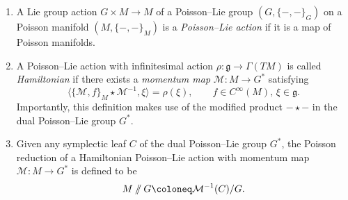 \begin{definition}
	\begin{enumerate}[label=(\roman*)]
		\item A Lie group action $G \times M \to M$ of a Poisson--Lie group $(G,\{-,-\}_G)$ on a Poisson manifold $(M,\{-,-\}_M)$ is a \emph{Poisson--Lie action} if it is a map of Poisson manifolds.
		\item A Poisson--Lie action with infinitesimal action $\rho \colon \mathfrak{g} \to \Gamma(TM)$ is called \emph{Hamiltonian} if there exists a \emph{momentum map} $\mathcal{M} \colon M \to G^*$ satisfying
		\begin{equation}\label{eq:momentumMap}
			\langle \{\mathcal{M},f\}_M \star \mathcal{M}^{-1}, \xi \rangle = \rho(\xi), \qquad f \in C^\infty(M), \, \xi \in \mathfrak{g}.
		\end{equation}
		Importantly, this definition makes use of the modified product $-\star-$ in the dual Poisson--Lie group $G^*$.
		\item Given any symplectic leaf $C$ of the dual Poisson--Lie group $G^*$, the Poisson reduction of a Hamiltonian Poisson--Lie action with momentum map $\mathcal{M} \colon M \to G^*$ is defined to be
		\begin{equation}
			M \hred G \coloneq \mathcal{M}^{-1}(C) / G.
		\end{equation}
	\end{enumerate}
\end{definition}

